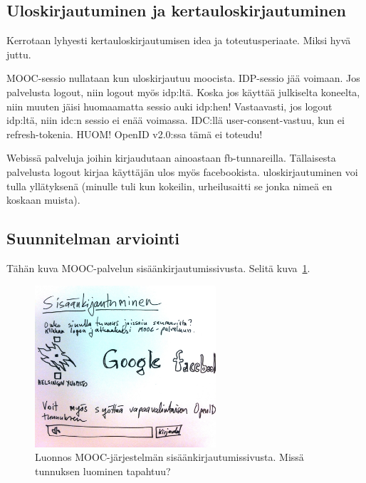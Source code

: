 \documentclass[finnish,gradu]{tktltiki}
\begin{document}


  \subsection{Uloskirjautuminen ja kertauloskirjautuminen} %
  \label{sub:kertauloskirjautuminen}
  Kerrotaan lyhyesti kertauloskirjautumisen idea ja toteutusperiaate. Miksi hyvä juttu.

  MOOC-sessio nullataan kun uloskirjautuu moocista. IDP-sessio jää voimaan. Jos palvelusta logout, niin logout myös idp:ltä. Koska jos käyttää julkiselta koneelta, niin muuten jäisi huomaamatta sessio auki idp:hen! Vastaavasti, jos logout idp:ltä, niin idc:n sessio ei enää voimassa. IDC:llä user-consent-vastuu, kun ei refresh-tokenia. HUOM! OpenID v2.0:ssa tämä ei toteudu!

  Webissä palveluja joihin kirjaudutaan ainoastaan fb-tunnareilla. Tällaisesta palvelusta logout kirjaa käyttäjän ulos myös facebookista. uloskirjautuminen voi tulla yllätyksenä (minulle tuli kun kokeilin, urheilusaitti se jonka nimeä en koskaan muista).




  \subsection{Suunnitelman arviointi} %
  \label{sub:suunnitelman_arviointi}

  Tähän kuva MOOC-palvelun sisäänkirjautumissivusta. Selitä kuva~\ref{fig:mooc_login_luonnos}.
  \begin{figure}
    \centering
    \includegraphics[width=0.6\textwidth]{images/mooc_login_sketch.jpg}
    \caption{Luonnos MOOC-järjestelmän sisäänkirjautumissivusta. Missä tunnuksen luominen tapahtuu?}
    \label{fig:mooc_login_luonnos}
  \end{figure}
\end{document}
